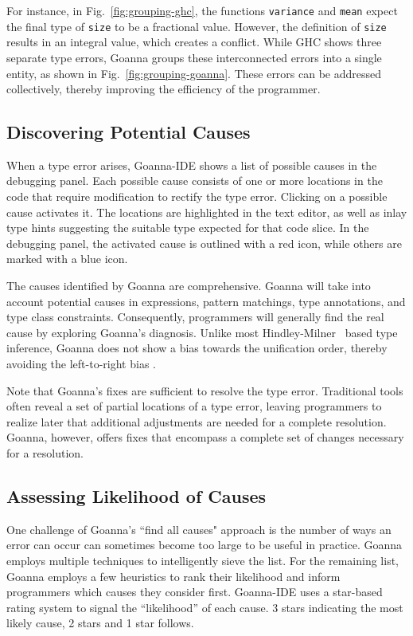 \documentclass[pdflatex,sn-nature,Numbered]{sn-jnl}%
\begin{document}
    For instance, in Fig.~\ref{fig:grouping-ghc}, the functions \texttt{variance} and \texttt{mean} expect the final type of \texttt{size} to be a fractional value. However, the definition of \texttt{size} results in an integral value, which creates a conflict. While GHC shows three separate type errors, Goanna groups these interconnected errors into a single entity, as shown in Fig.~\ref{fig:grouping-goanna}. These errors can be addressed collectively, thereby improving the efficiency of the programmer.

    \subsection{Discovering Potential Causes} \label{sub:suggesting}
    When a type error arises, Goanna-IDE shows a list of possible causes in the debugging panel. Each possible cause consists of one or more locations in the code that require modification to rectify the type error. Clicking on a possible cause activates it. The locations are highlighted in the text editor, as well as inlay type hints suggesting the suitable type expected for that code slice. In the debugging panel, the activated cause is outlined with a red icon, while others are marked with a blue icon. 

    The causes identified by Goanna are comprehensive. Goanna will take into account potential causes in expressions, pattern matchings, type annotations, and type class constraints. Consequently, programmers will generally find the real cause by exploring Goanna's diagnosis. Unlike most Hindley-Milner~\cite{Damas1982-zw} based type inference, Goanna does not show a bias towards the unification order, thereby avoiding the left-to-right bias \cite{Chen2014-ev}. 
    
    Note that Goanna's fixes are sufficient to resolve the type error. Traditional tools often reveal a set of partial locations of a type error, leaving programmers to realize later that additional adjustments are needed for a complete resolution. Goanna, however, offers fixes that encompass a complete set of changes necessary for a resolution.


    \subsection{Assessing Likelihood of Causes} \label{sub:conciseness}
    One challenge of Goanna's ``find all causes" approach is the number of ways an error can occur can sometimes become too large to be useful in practice. Goanna employs multiple techniques to intelligently sieve the list. For the remaining list, Goanna employs a few heuristics to rank their likelihood and inform programmers which causes they consider first. 
    Goanna-IDE uses a star-based rating system to signal the ``likelihood'' of each cause. 3 stars indicating the most likely cause, 2 stars and 1 star follows. 
\end{document}
